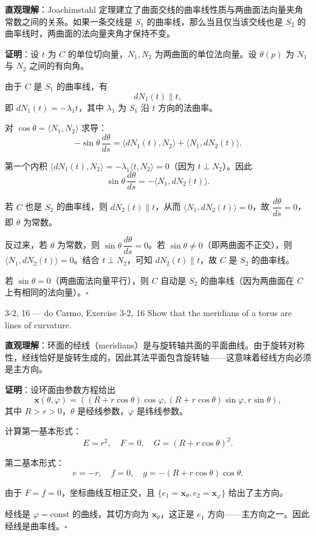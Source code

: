 \begin{solution}
\textbf{直观理解}：Joachimstahl 定理建立了曲面交线的曲率线性质与两曲面法向量夹角常数之间的关系。如果一条交线是 $S_1$ 的曲率线，那么当且仅当该交线也是 $S_2$ 的曲率线时，两曲面的法向量夹角才保持不变。

\textbf{证明}：设 $t$ 为 $C$ 的单位切向量，$N_1, N_2$ 为两曲面的单位法向量。设 $\theta(p)$ 为 $N_1$ 与 $N_2$ 之间的有向角。

由于 $C$ 是 $S_1$ 的曲率线，有
\[
dN_1(t) \parallel t,
\]
即 $dN_1(t) = -\lambda_1 t$，其中 $\lambda_1$ 为 $S_1$ 沿 $t$ 方向的法曲率。

对 $\cos\theta = \langle N_1, N_2 \rangle$ 求导：
\[
-\sin\theta \, \frac{d\theta}{ds} = \langle dN_1(t), N_2 \rangle + \langle N_1, dN_2(t) \rangle.
\]

第一个内积 $\langle dN_1(t), N_2 \rangle = -\lambda_1 \langle t, N_2 \rangle = 0$（因为 $t \perp N_2$）。因此
\[
\sin\theta \, \frac{d\theta}{ds} = -\langle N_1, dN_2(t) \rangle.
\]

若 $C$ 也是 $S_2$ 的曲率线，则 $dN_2(t) \parallel t$，从而 $\langle N_1, dN_2(t) \rangle = 0$，故 $\dfrac{d\theta}{ds} = 0$，即 $\theta$ 为常数。

反过来，若 $\theta$ 为常数，则 $\sin\theta \, \dfrac{d\theta}{ds} = 0$。若 $\sin\theta \neq 0$（即两曲面不正交），则 $\langle N_1, dN_2(t) \rangle = 0$。结合 $t \perp N_2$，可知 $dN_2(t) \parallel t$，故 $C$ 是 $S_2$ 的曲率线。

若 $\sin\theta = 0$（两曲面法向量平行），则 $C$ 自动是 $S_2$ 的曲率线（因为两曲面在 $C$ 上有相同的法向量）。$\square$
\end{solution}

\begin{exercise}{3-2, 16 — do Carmo, Exercise 3-2, 16}
Show that the meridians of a torus are lines of curvature.
\end{exercise}

\begin{solution}
\textbf{直观理解}：环面的经线（meridians）是与旋转轴共面的平面曲线。由于旋转对称性，经线恰好是旋转生成的，因此其法平面包含旋转轴——这意味着经线方向必须是主方向。

\textbf{证明}：设环面由参数方程给出
\[
\mathbf{x}(\theta, \varphi) = ((R + r\cos\theta)\cos\varphi, (R + r\cos\theta)\sin\varphi, r\sin\theta),
\]
其中 $R > r > 0$，$\theta$ 是经线参数，$\varphi$ 是纬线参数。

计算第一基本形式：
\[
E = r^2, \quad F = 0, \quad G = (R + r\cos\theta)^2.
\]

第二基本形式：
\[
e = -r, \quad f = 0, \quad g = -(R + r\cos\theta)\cos\theta.
\]

由于 $F = f = 0$，坐标曲线互相正交，且 $\{e_1 = \mathbf{x}_\theta, e_2 = \mathbf{x}_\varphi\}$ 给出了主方向。

经线是 $\varphi = \text{const}$ 的曲线，其切方向为 $\mathbf{x}_\theta$，这正是 $e_1$ 方向——主方向之一。因此经线是曲率线。$\square$
\end{solution}

